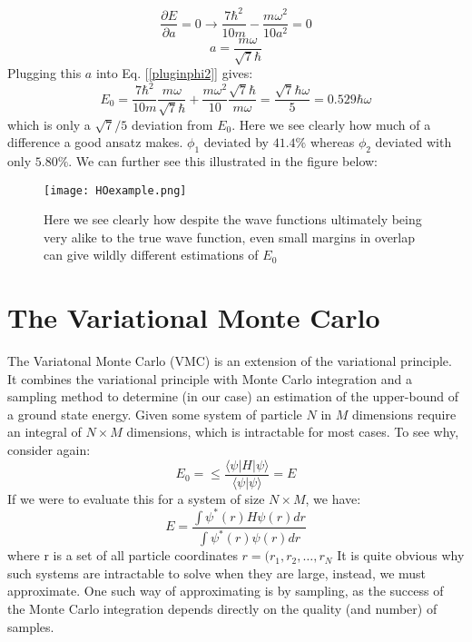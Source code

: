 \documentclass[12pt]{article}
\begin{document}
{\begin{equation*}
    \frac{\partial E}{\partial a} = 0 \xrightarrow[]{} \frac{7 \hbar^2}{10m} - \frac{m \omega^2}{10a^2} = 0
\end{equation*}
\begin{equation*}
    a = \frac{m\omega}{\sqrt{7} \hbar}
\end{equation*}
Plugging this $a$ into Eq. [\ref{pluginphi2}] gives:
\begin{equation}
    E_0 = \frac{7\hbar^2}{10m} \frac{m\omega}{\sqrt{7}\hbar} + \frac{m \omega^2}{10} \frac{\sqrt{7} \hbar}{m \omega} = \frac{\sqrt{7} \hbar \omega}{5} = 0.529\hbar \omega
\end{equation}
which is only a $\sqrt{7}/5$ deviation from $E_0$. \newline
Here we see clearly how much of a difference a good ansatz makes. $\phi_1$ deviated by $41.4\%$ whereas $\phi_2$ deviated with only $5.80\%$. We can further see this illustrated in the figure below:
\begin{figure}[ht!]
    \centering
    \texttt{[image: HOexample.png]}
    \caption{Here we see clearly how despite the wave functions ultimately being very alike to the true wave function, even small margins in overlap can give wildly different estimations of $E_0$}
    \label{figHOs}
\end{figure}
\section{The Variational Monte Carlo}
The Variatonal Monte Carlo (VMC) is an extension of the variational principle. It combines the variational principle with Monte Carlo integration and a sampling method to determine (in our case) an estimation of the upper-bound of a ground state energy. Given some system of particle $N$ in $M$ dimensions require an integral of $N \times M$ dimensions, which is intractable for most cases. To see why, consider again:
\begin{equation*}
    E_0 = \leq \frac{\langle \psi| H | \psi \rangle}{\langle \psi | \psi \rangle} = E
\end{equation*}
If we were to evaluate this for a system of size $N \times M$, we have:
\begin{equation} \label{tosolve}
    E = \frac{\int \psi^*(r) H \psi (r) dr}{\int \psi^* (r) \psi (r) dr}
\end{equation}
where r is a set of all particle coordinates $r = (r_1, r_2, \dots, r_N$ \newline
It is quite obvious why such systems are intractable to solve when they are large, instead, we must approximate. One such way of approximating is by sampling, as the success of the Monte Carlo integration depends directly on the quality (and number) of samples.\newline
}
\end{document}
